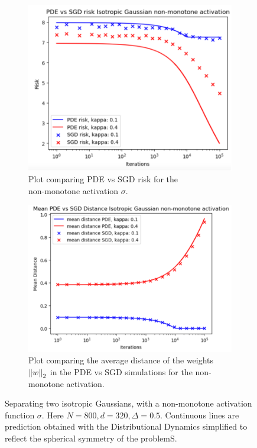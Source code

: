 \documentclass{article}
\begin{document}
    \begin{figure}[H]
\begin{subfigure}{0.5\textwidth}
  \centering
  \includegraphics[width=0.8\linewidth]{images/NGuyen2018-pde-sgd-risk-iso-gauss-non-mon.png}
  \caption{Plot comparing PDE vs SGD risk for the\\  non-monotone activation $ \sigma$.}
  \label{fig: pde vs sgd non-monotone}
\end{subfigure}%
\begin{subfigure}{0.5\textwidth}
  \centering
  \includegraphics[width=0.8\linewidth]{images/NGuyen2018-pde-sgd-iso-gauss-non-mon.png}
  \caption{ Plot comparing the average distance of the weights $ \left\lVert w\right\rVert_{2}$ in the PDE vs SGD simulations for the non-monotone activation.}
  \label{fig:  avg distance pde sgd non-monotone}
\end{subfigure}
\caption{ Separating two isotropic Gaussians, with a non-monotone activation function $ \sigma$. Here $N = 800, d = 320, \Delta = 0.5$. Continuous lines are prediction
obtained with the Distributional Dynamics simplified to reflect the spherical symmetry of the problemS.
}
\label{fig:  non-monotone simulation sgd vs pde}
\end{figure}
\end{document}
